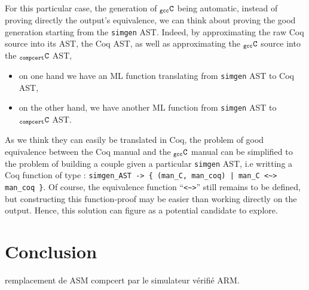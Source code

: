 \documentclass[a4paper, 11pt]{article}
\newcommand{\simgen}{{\tt simgen}\xspace}
\newcommand{\C}{$_{\tt compcert}{\tt C}$\xspace}
\newcommand{\gccC}{$_{\tt gcc}{\tt C}$\xspace}
\begin{document}
For this particular case, the generation of \gccC being automatic, instead of proving directly the output's equivalence, we can think about proving the good generation starting from the \simgen AST. Indeed, by approximating the raw Coq source into its AST, the Coq AST, as well as approximating the \gccC source into the \C AST, 
\begin{itemize}
\item on one hand we have an ML function translating from \simgen AST to Coq AST,
\item on the other hand, we have another ML function from \simgen AST to \C AST.
\end{itemize} 
As we think they can easily be translated in Coq, the problem of good equivalence between the Coq manual and the \gccC manual can be simplified to the problem of building a couple given a particular \simgen AST, i.e writting a Coq function of type : \verb!simgen_AST -> { (man_C, man_coq) | man_C <~> man_coq }!. Of course, the equivalence function ``\verb|<~>|'' still remains to be defined, but constructing this function-proof may be easier than working directly on the output. Hence, this solution can figure as a potential candidate to explore.

\section{Conclusion}
\label{s:concl}
remplacement de ASM compcert par le simulateur vérifié ARM.



\end{document}
